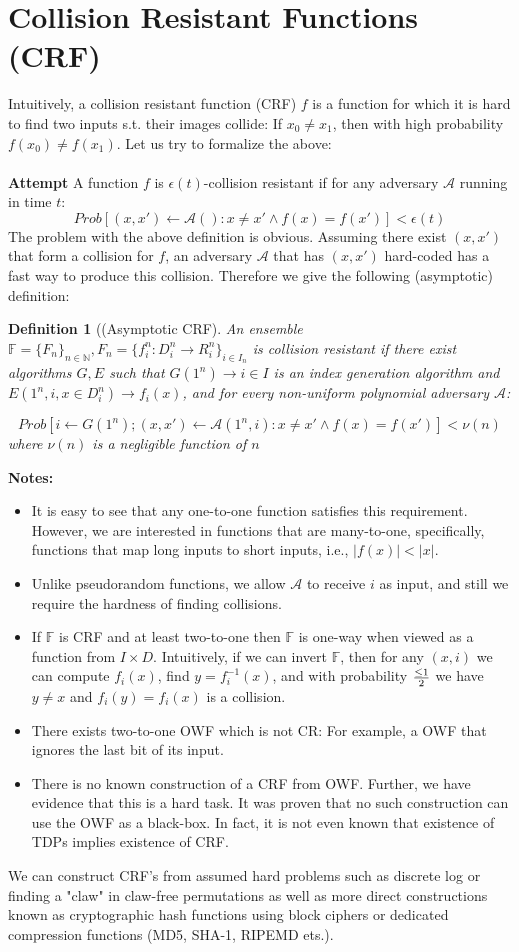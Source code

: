 \documentclass[12pt]{article}
\newcommand{\adv}{\mathcal{A}}
\newcommand{\pr}{Prob}
\newtheorem{definition}{Definition}[section]
\begin{document}
\section{Collision Resistant Functions (CRF)}
Intuitively, a collision resistant function (CRF) $f$ is a function for which it is hard
to find two inputs s.t. their images collide: If $x_0 \neq x_1$, then with high probability $f(x_0) \neq f(x_1)$. Let us try to formalize the above:\\\\
\textbf{Attempt}  A function $f$ is $\epsilon(t)$-collision resistant if for any adversary $\adv$
running in time $t$:
\[ \pr[ (x,x') \leftarrow \adv(): x \neq x' \wedge f(x) = f(x')] < \epsilon(t) \]
The problem with the above definition is obvious. Assuming there exist $(x,x')$ that form a collision for $f$, an adversary $\adv$ that has $(x,x')$ hard-coded has a fast way to produce this collision. Therefore we give the following (asymptotic) definition:\\
\begin{definition}[(Asymptotic CRF] An ensemble $\mathbb{F} = \{F_n\}_{n \in \mathbb{N}}, F_n = \{f^n_i : D^n_i \rightarrow R^n_i\}_{i \in I_n}$ is collision resistant if there exist algorithms $G,E$ such that $G(1^n) \rightarrow i \in I$ is an index generation algorithm and $E(1^n, i, x \in D^n_i ) \rightarrow f_i(x)$, and for every non-uniform polynomial adversary $\adv$:

\[\pr[i \leftarrow G(1^n); (x,x') \leftarrow \adv(1^n,i): x \neq x' \wedge f(x) = f(x')] < \nu(n)\]
where $\nu(n)$ is a negligible function of $n$
\end{definition}
\textbf{Notes:}
\begin{itemize}
\item It is easy to see that any one-to-one function satisfies this requirement. However, we are interested in functions that are many-to-one, specifically, functions that map long inputs to short inputs, i.e., $|f(x)| < |x|$.
\item Unlike pseudorandom functions, we allow $\adv$ to receive $i$ as input, and still we require the hardness of finding collisions.
\item If $\mathbb{F}$ is CRF and at least two-to-one then $\mathbb{F}$ is one-way when viewed as a function from $I \times D$. Intuitively, if we can invert $\mathbb{F}$, then for any $(x,i)$ we can compute $f_i(x)$, find $y= f^{-1}_i(x)$, and with probability $\leq 1 \over 2$ we have $y \neq x$ and $f_i(y) = f_i(x)$ is a collision.
\item There exists two-to-one OWF which is not CR: For example, a OWF that ignores the last bit of its input.
\item There is no known construction of a CRF from OWF. Further, we have evidence that this is a hard task. It was proven that no such construction can use the OWF as a black-box. In fact, it is not even known that existence of TDPs implies existence of CRF.
\end{itemize}
We can construct CRF's from assumed hard problems such as discrete log or finding a "claw" in claw-free permutations as well as more direct constructions known as cryptographic hash functions using block ciphers or dedicated compression functions (MD5, SHA-1, RIPEMD ets.). 
\end{document}
